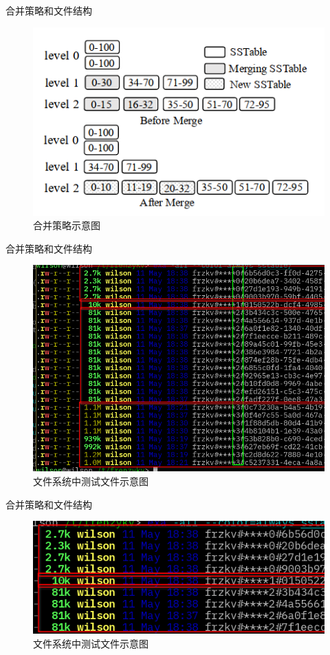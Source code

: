 \documentclass{beamer}
\begin{document}
\begin{frame}{合并策略和文件结构}
    \begin{figure}
        \centering
        \includegraphics[width=0.8\linewidth]{pic/LSM_merging.png}
        \caption{合并策略示意图}
    \end{figure}
\end{frame}

\begin{frame}{合并策略和文件结构}
    \begin{figure}
        \centering
        \includegraphics[width=0.9\linewidth]{pic/fs1.png}
        \caption{文件系统中测试文件示意图}
    \end{figure}
\end{frame}

\begin{frame}{合并策略和文件结构}
    \begin{figure}
        \centering
        \includegraphics[width=0.9\linewidth]{pic/fs2.png}
        \caption{文件系统中测试文件示意图}
    \end{figure}
\end{frame}
\end{document}
